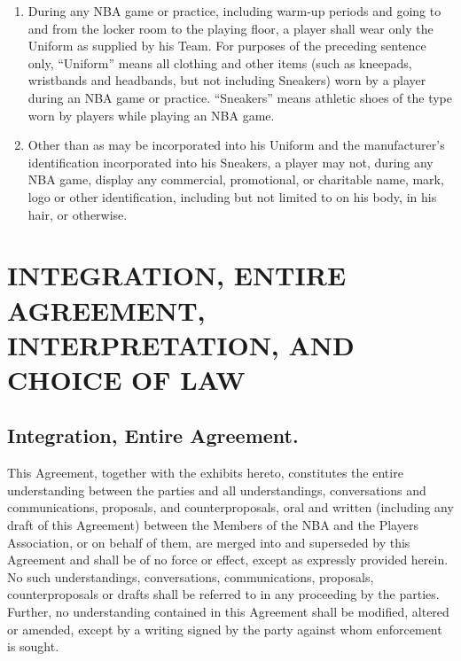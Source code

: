 \documentclass[
]{book}
\providecommand{\tightlist}{%
  \setlength{\itemsep}{0pt}\setlength{\parskip}{0pt}}
\begin{document}
\begin{enumerate}
\def\labelenumi{(\alph{enumi})}
\tightlist
\item
  During any NBA game or practice, including warm-up periods and going to and from the locker room to the playing floor, a player shall wear only the Uniform as supplied by his Team. For purposes of the preceding sentence only, ``Uniform'' means all clothing and other items (such as kneepads, wristbands and headbands, but not including Sneakers) worn by a player during an NBA game or practice. ``Sneakers'' means athletic shoes of the type worn by players while playing an NBA game.
\item
  Other than as may be incorporated into his Uniform and the manufacturer's identification incorporated into his Sneakers, a player may not, during any NBA game, display any commercial, promotional, or charitable name, mark, logo or other identification, including but not limited to on his body, in his hair, or otherwise.
\end{enumerate}

\hypertarget{integration-entire-agreement-interpretation-and-choice-of-law}{%
\chapter{INTEGRATION, ENTIRE AGREEMENT, INTERPRETATION, AND CHOICE OF LAW}\label{integration-entire-agreement-interpretation-and-choice-of-law}}


\hypertarget{integration-entire-agreement.}{%
\section{Integration, Entire Agreement.}\label{integration-entire-agreement.}}

This Agreement, together with the exhibits hereto, constitutes the entire understanding between the parties and all understandings, conversations and communications, proposals, and counterproposals, oral and written (including any draft of this Agreement) between the Members of the NBA and the Players Association, or on behalf of them, are merged into and superseded by this Agreement and shall be of no force or effect, except as expressly provided herein. No such understandings, conversations, communications, proposals, counterproposals or drafts shall be referred to in any proceeding by the parties. Further, no understanding contained in this Agreement shall be modified, altered or amended, except by a writing signed by the party against whom enforcement is sought.
\end{document}
